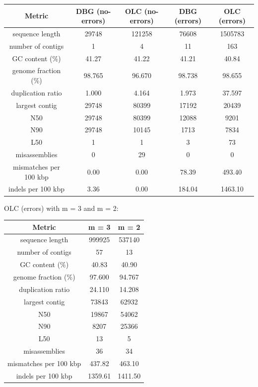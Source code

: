 \documentclass[12pt]{article}
\begin{document}
\begin{center}
\begin{tabular}{ |c|c|c||c|c| }
    \hline
    Metric               & DBG (no-errors) & OLC (no-errors) & DBG (errors) & OLC (errors) \\
    \hline
    sequence length      & 29748  & 121258  & 76608 & 1505783 \\
    number of contigs    & 1      & 4       & 11 & 163 \\
    GC content (\%)      & 41.27  & 41.22    & 41.21 & 40.84 \\
    genome fraction (\%) & 98.765 & 96.670    & 98.738 & 98.655 \\
    duplication ratio    & 1.000  & 4.164    & 1.973 & 37.597 \\
    largest contig       & 29748  & 80399    & 17192 & 20439 \\
    N50                  & 29748  & 80399    & 12088 & 9201 \\
    N90                  & 29748  & 10145    & 1713 & 7834 \\
    L50                  & 1      & 1       & 3 & 73 \\
    misassemblies        & 0      & 29        & 0 & 0 \\
    mismatches per 100 kbp & 0.00 & 0.00     & 78.39 & 493.40 \\
    indels per 100 kbp   & 3.36   & 0.00     & 184.04 & 1463.10  \\
    \hline
\end{tabular}
\end{center}


OLC (errors) with m = 3 and m = 2:
\begin{center}
    \begin{tabular}{ |c|c|c| }
        \hline
        Metric               & m = 3 & m = 2 \\
        \hline
        sequence length      & 999925  & 537140   \\
        number of contigs    & 57      & 13        \\
        GC content (\%)      & 40.83  & 40.90    \\
        genome fraction (\%) & 97.600 & 94.767    \\
        duplication ratio    & 24.110  & 14.208    \\
        largest contig       & 73843  & 62932    \\
        N50                  & 19867  & 54062    \\
        N90                  & 8207  & 25366    \\
        L50                  & 13      & 5       \\
        misassemblies        & 36      & 34        \\
        mismatches per 100 kbp & 437.82 & 463.10     \\
        indels per 100 kbp   & 1359.61   & 1411.50     \\
        \hline
    \end{tabular}
    \end{center}
\end{document}
